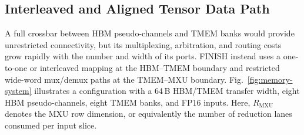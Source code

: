 \documentclass[sigconf,anonymous,nonacm]{acmart}
\newcommand{\ours}{\textsc{FINISH}}
\begin{document}
\subsection{Interleaved and Aligned Tensor Data Path}

A full crossbar between HBM pseudo-channels and TMEM banks would provide unrestricted connectivity, but its multiplexing, arbitration, and routing costs grow rapidly with the number and width of its ports.
\ours{} instead uses a one-to-one or interleaved mapping at the HBM--TMEM boundary and restricted wide-word mux/demux paths at the TMEM--MXU boundary.
Fig.~\ref{fig:memory-system} illustrates a configuration with a 64\,B HBM/TMEM transfer width, eight HBM pseudo-channels, eight TMEM banks, and FP16 inputs. Here, $R_{\mathrm{MXU}}$ denotes the MXU row dimension, or equivalently the number of reduction lanes consumed per input slice.

\end{document}
